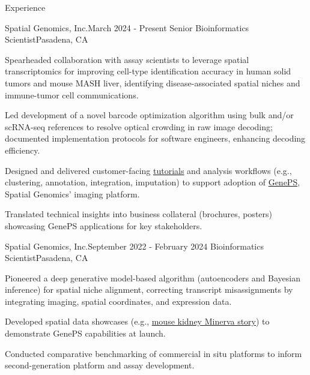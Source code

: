 \documentclass{resume} %
\begin{document}

\begin{rSection}{Experience}
\begin{rSubsection}{Spatial Genomics, Inc.}{March 2024 - Present}
{Senior Bioinformatics Scientist}{Pasadena, CA}
\item Spearheaded collaboration with assay scientists to leverage spatial transcriptomics for improving cell-type identification accuracy in human solid tumors and mouse MASH liver, identifying disease-associated spatial niches and immune-tumor cell communications.

\item Led development of a novel barcode optimization algorithm using bulk and/or scRNA-seq references to resolve optical crowding in raw image decoding; documented implementation protocols for software engineers, enhancing decoding efficiency.

\item Designed and delivered customer-facing \href{https://tutorials.spatialgenomics.com/intro.html}{tutorials} and analysis workflows (e.g., clustering, annotation, integration, imputation) to support adoption of \href{https://spatialgenomics.com/product/}{GenePS}, Spatial Genomics’ imaging platform.

\item Translated technical insights into business collateral (brochures, posters) showcasing GenePS applications for key stakeholders.
\end{rSubsection}

\begin{rSubsection}{Spatial Genomics, Inc.}{September 2022 - February 2024}
{Bioinformatics Scientist}{Pasadena, CA}
\item Pioneered a deep generative model-based algorithm (autoencoders and Bayesian inference) for spatial niche alignment, correcting transcript misassignments by integrating imaging, spatial coordinates, and expression data.

\item Developed spatial data showcases (e.g., \href{http://kidneyviewer.spatialgenomics.com/}{mouse kidney Minerva story}) to demonstrate GenePS capabilities at launch.

\item Conducted comparative benchmarking of commercial in situ platforms to inform second-generation platform and assay development.


\end{rSubsection}
\end{rSection}
\end{document}
